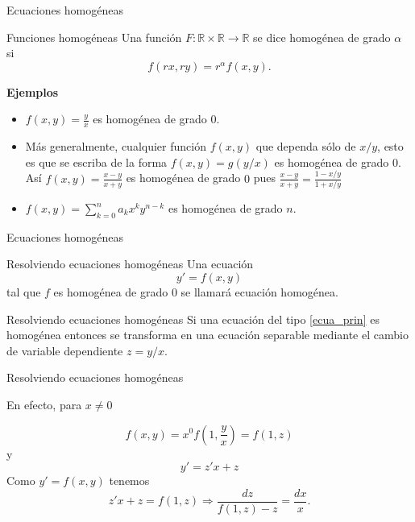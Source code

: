 \documentclass[handout,hyperref={colorlinks=true}]{beamer}
\newcommand{\rr}{\mathbb{R}}
\newcommand{\nl}{\onslide<+-> }
\begin{document}
\begin{frame}{Ecuaciones homogéneas}

\nl\begin{block}{Funciones homogéneas}
 Una función $F:\rr\times\rr\to\rr$ se dice homogénea de grado $\alpha$ si 
 \[f(rx,ry)=r^{\alpha}f(x,y).\]
\end{block}
\textbf{Ejemplos}
\begin{itemize}
                 \nl\item $f(x,y)=\tfrac{y}{x}$ es homogénea de grado $0$.
                \nl \item Más generalmente, cualquier función $f(x,y)$ que dependa sólo de $x/y$, esto es que se escriba de la forma $f(x,y)=g(y/x)$
                 es homogénea de grado  $0$. Así $f(x,y)=\tfrac{x-y}{x+y}$ es homogénea de grado $0$ pues $\tfrac{x-y}{x+y}= \tfrac{1-x/y}{1+x/y}$
                \nl \item $f(x,y)=\sum_{k=0}^na_kx^ky^{n-k}$ es homogénea de grado $n$.
\end{itemize}

\end{frame}

\begin{frame}{Ecuaciones homogéneas}

\nl\begin{block}{Resolviendo ecuaciones homogéneas}
 Una ecuación 
 \begin{equation}\label{ecua_prin}y'=f(x,y)\end{equation}
 tal que $f$ es homogénea de grado $0$ se llamará ecuación homogénea.
\end{block}

\nl\begin{block}{Resolviendo ecuaciones homogéneas}
 Si una ecuación del tipo \eqref{ecua_prin} es homogénea entonces se transforma en una ecuación separable mediante el cambio de variable dependiente $\boxed{z=y/x}$.
\end{block}


\end{frame}


\begin{frame}{Resolviendo ecuaciones homogéneas}

En efecto, para $x\neq 0$

\[f(x,y)=x^0f\left(1,\frac{y}{x}\right)=f(1,z)\]
y
\[y'=z'x+z\]
Como $y'=f(x,y)$ tenemos
\begin{equation}\label{cambio_hom}z'x+z=f(1,z)\Longrightarrow \frac{dz}{f(1,z)-z}=\frac{dx}{x}.\end{equation}
\end{frame}
\end{document}
